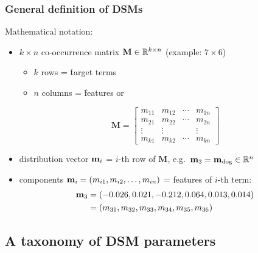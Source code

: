 \documentclass[t]{beamer} %
\begin{document}
\begin{frame}
  \frametitle{General definition of DSMs}

  Mathematical notation:
  \begin{itemize}
  \item $k \times n$ co-occurrence matrix $\mathbf{M}\in \mathbb{R}^{k\times n}$ (example: $7\times 6$)
    \begin{itemize}
    \item $k$ rows = \h{target} terms 
    \item $n$ columns = \h{features} or 
    \end{itemize}
    \begin{small}
      \gap[.5]
      \[
      \mathbf{M} =
      \begin{bmatrix}
        m_{11} & m_{12} & \cdots & m_{1n} \\
        m_{21} & m_{22} & \cdots & m_{2n} \\
        \vdots & \vdots & & \vdots \\
        m_{k1} & m_{k2} & \cdots & m_{kn}
      \end{bmatrix}
      \]
    \end{small}
  \item distribution vector $\Vector{m}_i$ = $i$-th row of $\mathbf{M}$, e.g.\ $\Vector{m}_3 = \Vector{m}_{\text{dog}} \in \setR^n$
  \item components $\Vector{m}_i = (m_{i1}, m_{i2}, \ldots, m_{in})$ = features of $i$-th term:
    \begin{align*}
      \Vector{m}_3 &= (-0.026, 0.021, -0.212, 0.064, 0.013, 0.014) \\
      &= (m_{31}, m_{32}, m_{33}, m_{34}, m_{35}, m_{36})
    \end{align*}
  \end{itemize}

\end{frame}


\subsection{A taxonomy of DSM parameters}
\end{document}
